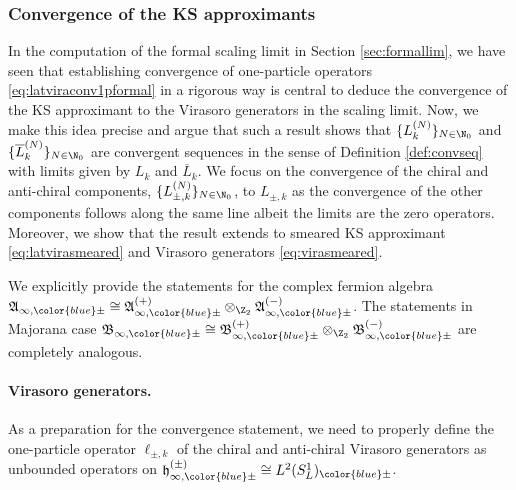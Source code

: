 \documentclass[a4paper, 11pt]{article}
\newcommand{\fA}{\mathfrak{A}}\newcommand{\cA}{\mathcal{A}}\newcommand{\dA}{\mathds{A}}\newcommand{\sA}{\mathscr{A}}
\newcommand{\fB}{\mathfrak{B}}\newcommand{\cB}{\mathcal{B}}\newcommand{\dB}{\mathds{B}}\newcommand{\sB}{\mathscr{B}}
\newcommand{\fh}{\mathfrak{h}}
\DeclareMathOperator{\1}{\mathds{1}}
\begin{document}
\subsubsection{Convergence of the KS approximants}
\label{sec:KSconv}
In the computation of the formal scaling limit in Section \ref{sec:formallim}, we have seen that establishing convergence of one-particle operators \eqref{eq:latviraconv1pformal} in a rigorous way is central to deduce the convergence of the KS approximant to the Virasoro generators in the scaling limit. Now, we make this idea precise and argue that such a result shows that $\{L^{(N)}_{k}\}_{N\in\N_{0}}$ and $\{\overline{L}^{(N)}_{k}\}_{N\in\N_{0}}$ are convergent sequences in the sense of Definition \ref{def:convseq} with limits given by $L_{k}$ and $\overline{L}_{k}$. We focus on the convergence of the chiral and anti-chiral components, $\{L^{(N)}_{\pm, k}\}_{N\in\N_{0}}$, to $L_{\pm,k}$ as the convergence of the other components follows along the same line albeit the limits are the zero operators. Moreover, we show that the result extends to smeared KS approximant \eqref{eq:latvirasmeared} and Virasoro generators \eqref{eq:virasmeared}.

\medskip

We explicitly provide the statements for the complex fermion algebra $\fA_{\infty,{\color{blue}\pm}}\cong\fA^{(+)}_{\infty,{\color{blue}\pm}}\otimes_{\Z_{2}}\fA^{(-)}_{\infty,{\color{blue}\pm}}$. The statements in Majorana case $\fB_{\infty,{\color{blue}\pm}}\cong\fB^{(+)}_{\infty,{\color{blue}\pm}}\otimes_{\Z_{2}}\fB^{(-)}_{\infty,{\color{blue}\pm}}$ are completely analogous.

\paragraph{Virasoro generators.} As a preparation for the convergence statement, we need to properly define the one-particle operator $\ell_{\pm,k}$ of the chiral and anti-chiral Virasoro generators as unbounded operators on $\fh^{(\pm)}_{\infty,{\color{blue}\pm}}\cong L^{2}(S^{1}_{L})_{{\color{blue}\pm}}$.
\end{document}
